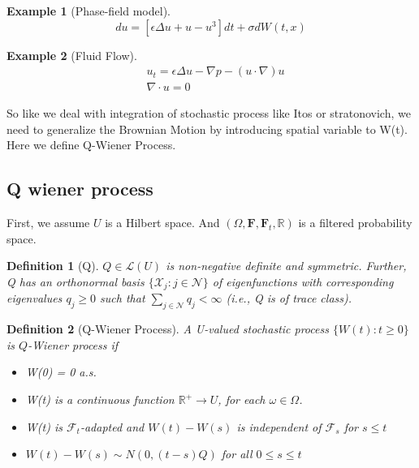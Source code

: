 \documentclass{article}
\newtheorem{definition}{Definition}
\newtheorem{example}{Example}
\begin{document}
\begin{example}[Phase-field model]
\begin{equation}
    du = [\epsilon \Delta u + u - u^3]dt + \sigma dW(t, x)
\end{equation}
\end{example}

\begin{example}[Fluid Flow]
    \begin{equation}
        \begin{aligned}
            &u_t = \epsilon \Delta u - \nabla p - (u\cdot \nabla)u\\
            &\nabla\cdot u = 0
        \end{aligned}
    \end{equation}
\end{example}


So like we deal with integration of stochastic process like Itos or stratonovich, we need to generalize the Brownian Motion by introducing spatial variable to W(t). 
Here we define Q-Wiener Process. 
\subsection{Q wiener process}
First, we assume $U$ is a Hilbert space. And $(\Omega, \mathbf{F}, \mathbf{F}_t, \mathbb{R})$ is a filtered probability space. 
\begin{definition}[Q]\label{Q}
    $Q \in \mathcal{L}(U)$ is non-negative definite and symmetric. 
    Further, Q has an orthonormal basis $\{ \mathcal{X}_j : j \in \mathcal{N}\}$ of eigenfunctions with corresponding eigenvalues $q_j \geq 0$  such that $\sum_{j\in\mathcal{N}} q_j < \infty$ (i.e., Q is of trace class).
\end{definition}

\begin{definition}[Q-Wiener Process]
    A U-valued stochastic process $\{W(t):t\geq 0\}$ is $Q$-Wiener process if 
    \begin{itemize}
        \item W(0) = 0 a.s.
        \item W(t) is a continuous function $\mathbb{R}^+\rightarrow U$, for each $\omega \in \Omega$.
        \item W(t) is $\mathcal{F}_t$-adapted and $W(t) - W(s)$ is independent of $\mathcal{F}_s$ for $s\leq t$
        \item $W(t) - W(s)\sim N(0, (t-s)Q)$ for all $0\leq s\leq t$
    \end{itemize}
\end{definition}
\end{document}
